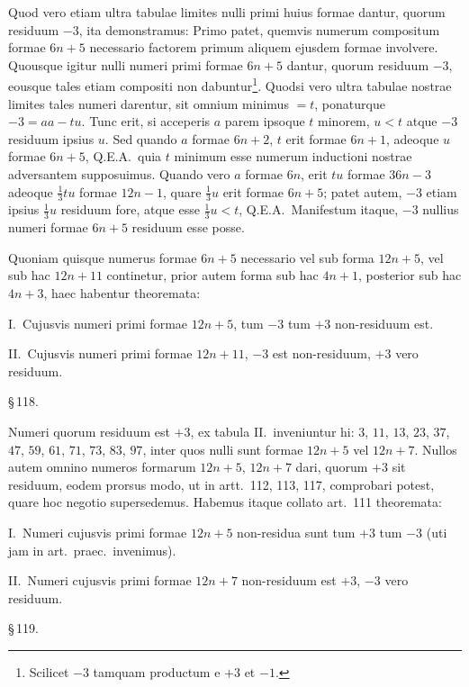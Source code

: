 \documentclass[12pt,a4paper]{article}
\theoremstyle{plain}
\theoremstyle{definition}
\theoremstyle{remark}
\begin{document}
Quod vero etiam ultra tabulae limites nulli primi huius formae dantur, quorum residuum $-3$, ita demonstramus: Primo patet, quemvis numerum compositum formae $6n+5$ necessario factorem primum aliquem ejusdem formae involvere. Quousque igitur nulli numeri primi formae $6n+5$ dantur, quorum residuum $-3$, eousque tales etiam compositi non dabuntur\footnote{Scilicet $-3$ tamquam productum e $+3$ et $-1$.}. Quodsi vero ultra tabulae nostrae limites tales numeri darentur, sit omnium minimus $= t$, ponaturque $-3 = aa - tu$. Tunc erit, si acceperis $a$ parem ipsoque $t$ minorem, $u < t$ atque $-3$ residuum ipsius $u$. Sed quando $a$ formae $6n+2$, $t$ erit formae $6n+1$, adeoque $u$ formae $6n+5$, Q.E.A.\ quia $t$ minimum esse numerum inductioni nostrae adversantem supposuimus. Quando vero $a$ formae $6n$, erit $tu$ formae $36n-3$ adeoque $\frac{1}{3}tu$ formae $12n-1$, quare $\frac{1}{3}u$ erit formae $6n+5$; patet autem, $-3$ etiam ipsius $\frac{1}{3}u$ residuum fore, atque esse $\frac{1}{3}u < t$, Q.E.A.\ Manifestum itaque, $-3$ nullius numeri formae $6n+5$ residuum esse posse.

Quoniam quisque numerus formae $6n+5$ necessario vel sub forma $12n+5$, vel sub hac $12n+11$ continetur, prior autem forma sub hac $4n+1$, posterior sub hac $4n+3$, haec habentur theoremata:

\textsc{I.}\ Cujusvis numeri primi formae $12n+5$, tum $-3$ tum $+3$ non-residuum est.

\textsc{II.}\ Cujusvis numeri primi formae $12n+11$, $-3$ est non-residuum, $+3$ vero residuum.

\begin{center}\S\,118.\end{center}

Numeri quorum residuum est $+3$, ex tabula II.\ inveniuntur hi: $3$, $11$, $13$, $23$, $37$, $47$, $59$, $61$, $71$, $73$, $83$, $97$, inter quos nulli sunt formae $12n+5$ vel $12n+7$. Nullos autem omnino numeros formarum $12n+5$, $12n+7$ dari, quorum $+3$ sit residuum, eodem prorsus modo, ut in artt.~112, 113, 117, comprobari potest, quare hoc negotio supersedemus. Habemus itaque collato art.~111 theoremata:

\textsc{I.}\ Numeri cujusvis primi formae $12n+5$ non-residua sunt tum $+3$ tum $-3$ (uti jam in art.\ praec.\ invenimus).

\textsc{II.}\ Numeri cujusvis primi formae $12n+7$ non-residuum est $+3$, $-3$ vero residuum.

\begin{center}\S\,119.\end{center}
\end{document}
